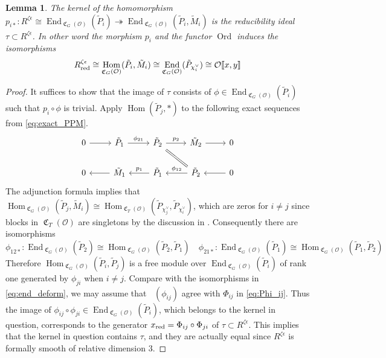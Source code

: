 \documentclass[leqno]{amsart}
\newtheorem{lem}[thm]{Lemma}
\theoremstyle{definition}
\theoremstyle{remark}
\newcommand{\oo}{\mathcal{O}}
\DeclareMathOperator{\End}{End}
\DeclareMathOperator{\Hom}{Hom}
\DeclareMathOperator{\fC}{\mathfrak{C}} %
\DeclareMathOperator{\V}{\check{\mathbf{V}}} %
\DeclareMathOperator{\Ord}{Ord} %
\newcommand{\red}{\textnormal{red}}
\newcommand{\xx}{x_\textnormal{red}}
\begin{document}
\begin{lem}\label{lem:ker_red}
	The kernel of the homomorphism
    $p_{i*}\colon R^{\zeta\epsilon}\cong
    \End_{\fC_G(\oo)}(\tilde{P}_i)\twoheadrightarrow
	\End_{\fC_G(\oo)}(\tilde{P}_i, \tilde{M}_i)$
	is the reducibility ideal $\tau\subset R^{\zeta\epsilon}$.
    In other word the morphism $p_i$ and the functor $\Ord$ induces
    the isomorphisms
	\begin{equation}
	R^{\zeta\epsilon}_\red\cong 
	\Hom_{\fC_G(\oo)}(\tilde{P}_i, \tilde{M}_i)\cong
	\End_{\fC_G(\oo)}(\tilde{P}_{\chi_i^\vee})\cong
	\oo\llbracket x,y\rrbracket
	\end{equation}
\end{lem}
\begin{proof}
It suffices to show that 
the image of $\tau$ consists of 
$\phi\in \End_{\fC_G(\oo)}(\tilde{P}_i)$
such that $p_i\circ \phi$ is trivial.
Apply $\Hom(\tilde{P}_j,*)$
to the following exact sequences
from \eqref{eq:exact_PPM}.
\[
\begin{tikzcd}
	0 \arrow[r]&
	\tilde{P}_1  \arrow[r,"\phi_{21}"]  &
	\tilde{P}_2 \arrow[r,"p_2"] \arrow[dr,equal] &
	\tilde{M}_2  \arrow[r] & 0 \\
	0 & 
	\tilde{M}_1 \arrow[l]&
	\tilde{P}_1 \arrow[l,"p_1",swap]  &
	\tilde{P}_2  \arrow[l,"\phi_{12}",swap]  & 
	0  \arrow[l] 
\end{tikzcd}
\]
The adjunction formula implies that
$\Hom_{\fC_G(\oo)}(\tilde{P}_j,\tilde{M}_i)\cong
\Hom_{\fC_T(\oo)}
(\tilde{P}_{\chi_j^\vee},\tilde{P}_{\chi_i^\vee})$,
which are zeros for $i\neq j$
since blocks in $\fC_T(\oo)$ are singletons
by the discussion in \cite[\S 7.2]{pask}.
Consequently there are isomorphisms
\[
	\phi_{12*}\colon
	\End_{\fC_G(\oo)}(\tilde{P}_2)\cong
	\Hom_{\fC_G(\oo)}(\tilde{P}_2, \tilde{P}_1)\quad
	\phi_{21*}\colon
	\End_{\fC_G(\oo)}(\tilde{P}_1)\cong
	\Hom_{\fC_G(\oo)}(\tilde{P}_1, \tilde{P}_2)
\]
Therefore $\Hom_{\fC_G(\oo)}(\tilde{P}_i, \tilde{P}_j)$
is a free module over $\End_{\fC_G(\oo)}(\tilde{P}_i)$
of rank one generated by $\phi_{ji}$ when $i\neq j$.
Compare with the isomorphisms in \eqref{eq:end_deform},
we may assume that $\V(\phi_{ij})$ agree with 
$\Phi_{ij}$ in \eqref{eq:Phi_ij}.
Thus the image of 
$\phi_{ij}\circ\phi_{ji}\in \End_{\fC_G(\oo)}(\tilde{P}_i)$,
which belongs to the kernel in question,
corresponds to the generator 
$\xx=\Phi_{ij}\circ\Phi_{ji}$ of 
$\tau\subset R^{\zeta\epsilon}$.
This implies that the kernel in question
contains $\tau$, and they are actually equal
since $R^{\zeta\epsilon}$ is formally smooth of relative dimension  $3$.
\end{proof}
\end{document}
